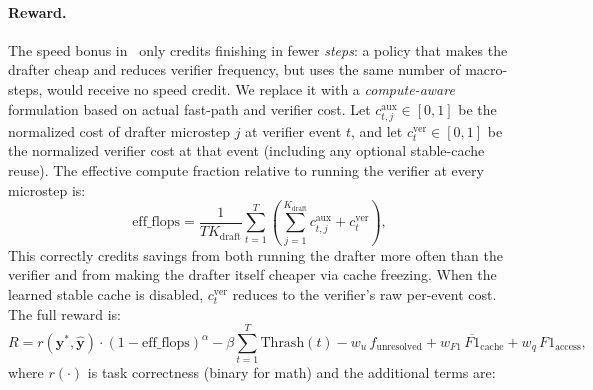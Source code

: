 \documentclass[11pt]{article}
\newcommand{\by}{\mathbf{y}}
\begin{document}
\paragraph{Reward.}
The speed bonus in~ only credits finishing in fewer \emph{steps}: a policy that makes the drafter cheap and reduces verifier frequency, but uses the same number of macro-steps, would receive no speed credit.
We replace it with a \emph{compute-aware} formulation based on actual fast-path and verifier cost.
Let $c_{t,j}^{\text{aux}} \in [0,1]$ be the normalized cost of drafter microstep $j$ at verifier event $t$, and let $c_t^{\text{ver}} \in [0,1]$ be the normalized verifier cost at that event (including any optional stable-cache reuse). The effective compute fraction relative to running the verifier at every microstep is:
\begin{equation}
    \text{eff\_flops} = \frac{1}{T K_{\text{draft}}} \sum_{t=1}^{T} \left( \sum_{j=1}^{K_{\text{draft}}} c_{t,j}^{\text{aux}} + c_t^{\text{ver}} \right),
    \label{eq:eff_flops}
\end{equation}
This correctly credits savings from both running the drafter more often than the verifier and from making the drafter itself cheaper via cache freezing. When the learned stable cache is disabled, $c_t^{\text{ver}}$ reduces to the verifier's raw per-event cost.
The full reward is:
\begin{equation}
    R = r(\by^*, \hat{\by}) \cdot (1 - \text{eff\_flops})^\alpha
      - \beta \sum_{t=1}^{T} \text{Thrash}(t)
      - w_u\, f_{\text{unresolved}}
      + w_{F1}\, \overline{F1}_{\text{cache}}
      + w_q\, F1_{\text{access}},
    \label{eq:reward}
\end{equation}
where $r(\cdot)$ is task correctness (binary for math) and the additional terms are:
\end{document}
